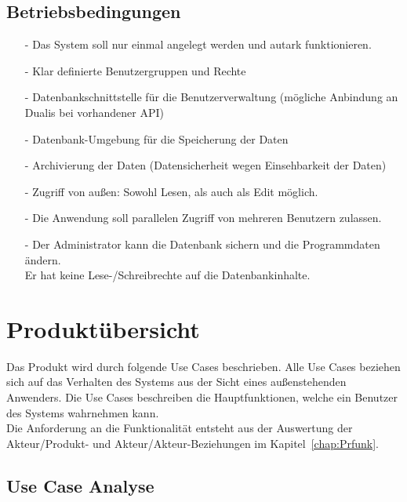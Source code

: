 		\subsection{Betriebsbedingungen}
		\begin{itemize}
		\item[-]	Das System soll nur einmal angelegt werden und autark funktionieren.
		\item[-]	Klar definierte Benutzergruppen und Rechte
		\item[-]	Datenbankschnittstelle für die Benutzerverwaltung (mögliche Anbindung an Dualis bei vorhandener API)
		\item[-]	Datenbank-Umgebung für die Speicherung der Daten
		\item[-]	Archivierung der Daten (Datensicherheit wegen Einsehbarkeit der Daten)
		\item[-]	Zugriff von außen: Sowohl Lesen, als auch als Edit möglich. 
		\item[-]	Die Anwendung soll parallelen Zugriff von mehreren Benutzern zulassen.
		\item[-]	Der Administrator kann die Datenbank sichern und die Programmdaten ändern.\\
					Er hat keine Lese-/Schreibrechte auf die Datenbankinhalte.
		\end{itemize}

		
		
	\section{Produktübersicht}
	
	Das Produkt wird durch folgende Use Cases beschrieben. Alle Use Cases beziehen sich auf das Verhalten des Systems aus der Sicht eines außenstehenden Anwenders. Die Use Cases beschreiben die Hauptfunktionen, welche ein Benutzer des Systems wahrnehmen kann.\\
	Die Anforderung an die Funktionalität entsteht aus der Auswertung der Akteur/Produkt- und Akteur/Akteur-Beziehungen im Kapitel~\ref{chap:Prfunk}.
	
	\subsection{Use Case Analyse}
	
